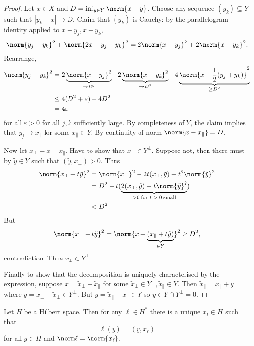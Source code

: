 \documentclass[a4paper]{article}
\begin{document}
\begin{proof}
  Let \(x \in X\) and \(D = \inf_{y \in Y} \norm{x - y}\). Choose any sequence \((y_k) \subseteq Y\) such that \(|y_k - x| \to D\). Claim that \((y_k)\) is Cauchy: by the parallelogram identity applied to \(x - y_j, x - y_k\),
  \[
    \norm{y_j - y_k}^2 + \norm{2x - y_j - y_k}^2 = 2 \norm{x - y_j}^2 + 2 \norm{x - y_k}^2.
  \]
  Rearrange,
  \begin{align*}
    \norm{y_j - y_k}^2
    &= 2 \underbrace{\norm{x - y_j}^2}_{\to D^2} + 2 \underbrace{\norm{x - y_k}^2}_{\to D^2} - 4 \underbrace{\norm{x - \frac{1}{2}(y_j + y_k)}^2}_{\geq D^2} \\
    &\leq 4(D^2 + \varepsilon) - 4D^2 \\
    &= 4\varepsilon
  \end{align*}
  for all \(\varepsilon > 0\) for all \(j, k\) sufficiently large. By completeness of \(Y\), the claim implies that \(y_j \to x_\parallel\) for some \(x_\parallel \in Y\). By continuity of norm \(\norm{x - x_\parallel} = D\).

  Now let \(x_\perp = x - x_\parallel\). Have to show that \(x_\perp \in Y^\perp\). Suppose not, then there must by \(\tilde y \in Y\) such that \((\tilde y, x_\perp) > 0\). Thus
  \begin{align*}
    \norm{x_\perp - t \tilde y}^2
    &= \norm{x_\perp}^2 - 2t(x_\perp, \tilde y) + t^2 \norm{\tilde y}^2 \\
    &= D^2 - t(\underbrace{2(x_\perp, \tilde y) - t\norm{\tilde y}^2}_{> 0 \text{ for \(t > 0\) small}}) \\
    &< D^2
  \end{align*}
  But
  \[
    \norm{x_\perp - t\tilde y}^2
    = \norm{x - \underbrace{(x_\parallel + t \tilde y)}_{\in Y}}^2
    \geq D^2,
  \]
  contradiction. Thus \(x_\perp \in Y^\perp\).

  Finally to show that the decomposition is uniquely characterised by the expression, suppose \(x = \tilde x_\perp + \tilde x_\parallel\) for some \(\tilde x_\perp \in Y^\perp, \tilde x_\parallel \in Y\). Then \(\tilde x_\parallel = x_\parallel + y\) where \(y = x_\perp - \tilde x_\perp \in Y^\perp\). But \(y = \tilde x_\parallel - x_\parallel \in Y\) so \(y \in Y \cap Y^\perp = 0\).
\end{proof}

\begin{theorem}
  Let \(H\) be a Hilbert space. Then for any \(\ell \in H^*\) there is a unique \(x_\ell \in H\) such that
  \[
    \ell(y) = (y, x_\ell)
  \]
  for all \(y \in H\) and \(\norm \ell = \norm{x_\ell}\).
\end{theorem}
\end{document}
